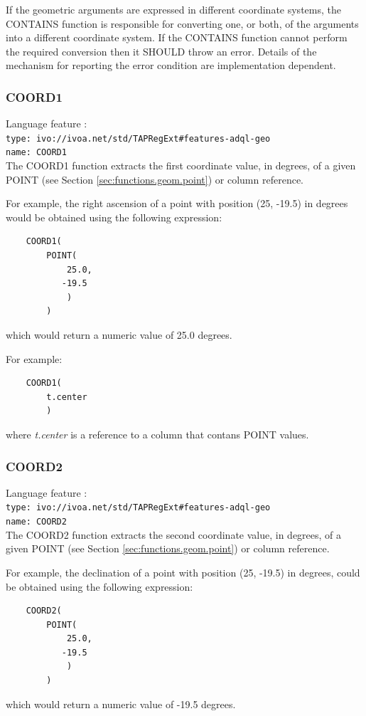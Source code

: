 \documentclass[11pt,a4paper]{ivoa}
\newcommand{\SectionSee}[1]{(see Section \ref{#1})\xspace}
\begin{document}
If the geometric arguments are expressed in different coordinate systems,
the CONTAINS function is responsible for converting one, or both, of the
arguments into a different coordinate system.
If the CONTAINS function cannot perform the required conversion then
it SHOULD throw an error.
Details of the mechanism for reporting the error condition are
implementation dependent.

\subsubsection{COORD1}
\label{sec:functions.geom.coord1}
{\footnotesize Language feature :}\\
{\footnotesize \verb|type: ivo://ivoa.net/std/TAPRegExt#features-adql-geo|}\\
{\footnotesize \verb|name: COORD1|}\\

The COORD1 function extracts the first coordinate value, in degrees, of a given
POINT \SectionSee{sec:functions.geom.point} or column reference.

For example, the right ascension of a point with position (25, -19.5) in
degrees would be obtained using the following expression:
\begin{verbatim}
    COORD1(
        POINT(
            25.0,
           -19.5
            )
        )
\end{verbatim}
\noindent
which would return a numeric value of 25.0 degrees.

For example:
\begin{verbatim}
    COORD1(
        t.center
        )
\end{verbatim}
\noindent
where \textit{t.center} is a reference to a column that contans POINT values.

\subsubsection{COORD2}
\label{sec:functions.geom.coord2}
{\footnotesize Language feature :}\\
{\footnotesize \verb|type: ivo://ivoa.net/std/TAPRegExt#features-adql-geo|}\\
{\footnotesize \verb|name: COORD2|}\\

The COORD2 function extracts the second coordinate value, in degrees, of a given
POINT \SectionSee{sec:functions.geom.point} or column reference.

For example, the declination of a point with position (25, -19.5) in degrees,
could be obtained using the following expression:
\begin{verbatim}
    COORD2(
        POINT(
            25.0,
           -19.5
            )
        )
\end{verbatim}
\noindent
which would return a numeric value of -19.5 degrees.
\end{document}
